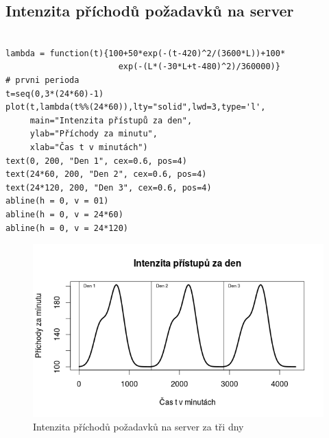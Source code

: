 \documentclass[12pt]{article}
\begin{document}
\subsection{Intenzita příchodů požadavků na server}
 \begin{lstlisting}[frame=single]  % Start your code-block
  
lambda = function(t){100+50*exp(-(t-420)^2/(3600*L))+100*
                       exp(-(L*(-30*L+t-480)^2)/360000)}
# prvni perioda
t=seq(0,3*(24*60)-1)
plot(t,lambda(t%%(24*60)),lty="solid",lwd=3,type='l',
     main="Intenzita přístupů za den",
     ylab="Příchody za minutu",
     xlab="Čas t v minutách")
text(0, 200, "Den 1", cex=0.6, pos=4)
text(24*60, 200, "Den 2", cex=0.6, pos=4)
text(24*120, 200, "Den 3", cex=0.6, pos=4)
abline(h = 0, v = 01)
abline(h = 0, v = 24*60)
abline(h = 0, v = 24*120)
\end{lstlisting}
\begin{figure}[ht!]
	\includegraphics[scale=0.5]{img/2_1_intenzita_prichodu}\centering
	\caption{Intenzita příchodů požadavků na server za tři dny}
	\label{obr:sikme}
\end{figure}
\end{document}
